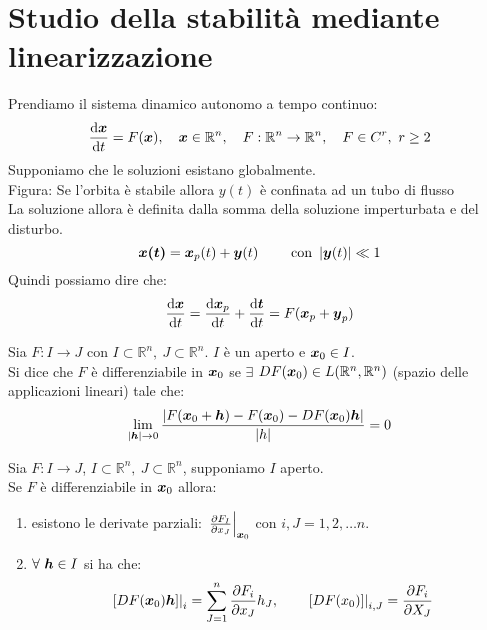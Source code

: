 \section{Studio della stabilità mediante linearizzazione}%
\label{sub:Studio della stabilità mediante linearizzazione per SD a tempo continuo autonomo}
Prendiamo il sistema dinamico autonomo a tempo continuo:
\[
    \frac{\text{d} \boldsymbol{x}}{\text{d} t} = F(\boldsymbol{x}),  \quad \boldsymbol{x}\in \mathbb{R}^n, \quad F:\mathbb{R}^n\to \mathbb{R}^n, \quad F \in C^r,\ r\ge 2
\] 
Supponiamo che le soluzioni esistano globalmente. \\
Figura: Se l'orbita è stabile allora $y(t)$  è confinata ad un tubo di flusso\\
La soluzione allora è definita dalla somma della soluzione imperturbata e del disturbo.
\[
    \boldsymbol{x(t)} =\boldsymbol{x}_p(t)+\boldsymbol{y} (t) \qquad \text{ con } \left|\boldsymbol{y} (t)\right|\ll 1
\] 
Quindi possiamo dire che:
\[
    \frac{\text{d} \boldsymbol{x}}{\text{d} t} = \frac{\text{d} \boldsymbol{x}_p}{\text{d} t} + \frac{\text{d} \boldsymbol{t}}{\text{d} t} = F(\boldsymbol{x}_p + \boldsymbol{y}_p)
\] 
\begin{defn}
    Sia $F:I\to J$ con $I \subset \mathbb{R}^n, \ J \subset \mathbb{R}^n$. $I$ è un aperto e $\boldsymbol{x}_0 \in I$.\\
    Si dice che $F$ è differenziabile in $\boldsymbol{x}_0$ se $\exists$ $DF(\boldsymbol{x}_0) \in L(\mathbb{R}^n, \mathbb{R}^n)$ (spazio delle applicazioni lineari) tale che:
    \[
	\lim_{\left|\boldsymbol{h}\right| \to 0} \frac{\left|F(\boldsymbol{x}_0+ \boldsymbol{h})-F(\boldsymbol{x}_0)-DF(\boldsymbol{x}_0) \boldsymbol{h}\right|}{\left|h\right|} = 0
    \] 
\end{defn}
\noindent
\begin{thm}
    Sia $F:I\to J$, $I \subset \mathbb{R}^n, \ J \subset \mathbb{R}^n$, supponiamo $I$  aperto.\\
    Se $F$  è differenziabile in $\boldsymbol{x}_0$  allora:
    \begin{enumerate}
        \item esistono le derivate parziali: $\left.\frac{\partial F_I}{\partial x_J}\right|_{\boldsymbol{x}_0} $ con $i, J = 1, 2, \ldots n$. 
	    \item $\forall \ \boldsymbol{h}  \in I$ si ha che:
		\[
		    \left.\left[DF(\boldsymbol{x}_0) \boldsymbol{h}\right]\right|_{i} = 
			\sum_{J=1}^{n} \frac{\partial F_i}{\partial x_J} h_J, 
			\qquad \left.\left[DF(x_0)\right]\right|_{i, J} = \frac{\partial F_i}{\partial X_J} 
		\] 
    \end{enumerate}
\end{thm}
